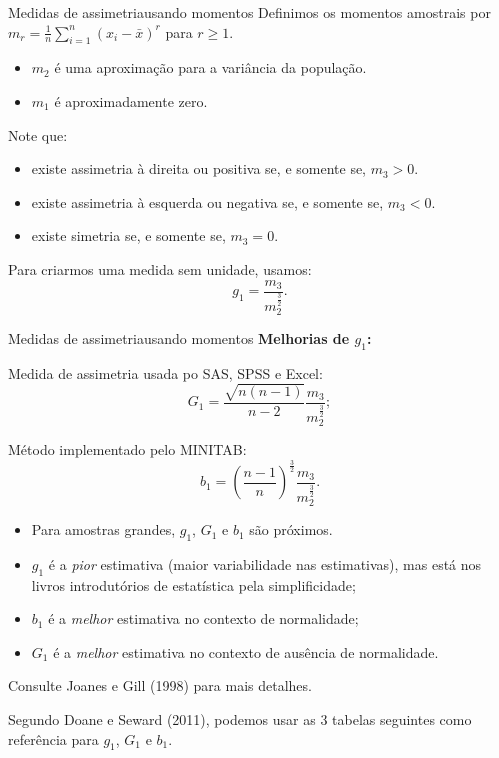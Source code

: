 \documentclass[
  10pt,
  ignorenonframetext,
]{beamer}
\providecommand{\tightlist}{%
  \setlength{\itemsep}{0pt}\setlength{\parskip}{0pt}}\usepackage{longtable,booktabs,array}
\begin{document}
\begin{frame}{Medidas de assimetria\newline usando momentos}
\protect\hypertarget{medidas-de-assimetriausando-momentos}{}
Definimos os momentos amostrais por
\(m_r = \frac{1}{n} \sum_{i=1}^{n} (x_i - \bar{x})^r\) para
\(r \geq 1\).

\begin{itemize}
\tightlist
\item
  \(m_2\) é uma aproximação para a variância da população.
\item
  \(m_1\) é aproximadamente zero.
\end{itemize}

Note que:

\begin{itemize}
\tightlist
\item
  existe assimetria à direita ou positiva se, e somente se, \(m_3 > 0\).
\item
  existe assimetria à esquerda ou negativa se, e somente se,
  \(m_3 < 0\).
\item
  existe simetria se, e somente se, \(m_3 = 0\).
\end{itemize}

Para criarmos uma medida sem unidade, usamos: \[
g_1 = \frac{m_3}{m_2^\frac{3}{2}}.
\]
\end{frame}

\begin{frame}{Medidas de assimetria\newline usando momentos}
\protect\hypertarget{medidas-de-assimetriausando-momentos-1}{}
\textbf{Melhorias de \(g_1\):}

Medida de assimetria usada po SAS, SPSS e Excel: \[
G_1 = \frac{\sqrt{n(n-1)}}{n-2} \frac{m_3}{m_2^{\frac{3}{2}}};
\]

Método implementado pelo MINITAB: \[
b_1 = \left( \frac{n-1}{n} \right)^{\frac{3}{2}} \frac{m_3}{m_2^{\frac{3}{2}}}.
\]
\end{frame}

\begin{frame}
\begin{itemize}
\tightlist
\item
  Para amostras grandes, \(g_1\), \(G_1\) e \(b_1\) são próximos.
\item
  \(g_1\) é a \emph{pior} estimativa (maior variabilidade nas
  estimativas), mas está nos livros introdutórios de estatística pela
  simplificidade;
\item
  \(b_1\) é a \emph{melhor} estimativa no contexto de normalidade;
\item
  \(G_1\) é a \emph{melhor} estimativa no contexto de ausência de
  normalidade.
\end{itemize}

Consulte Joanes e Gill (1998) para mais detalhes.

Segundo Doane e Seward (2011), podemos usar as 3 tabelas seguintes como
referência para \(g_1\), \(G_1\) e \(b_1\).
\end{frame}
\end{document}
